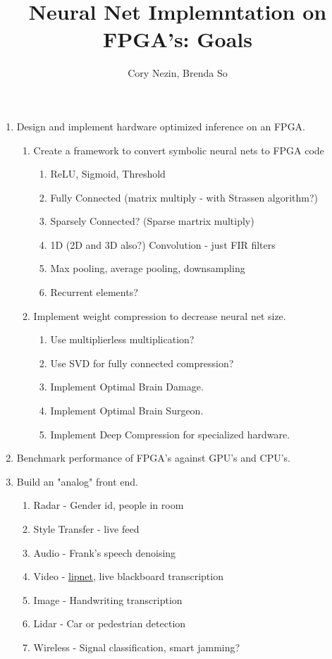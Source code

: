 \documentclass[12pt]{article}
\begin{document}
\title{Neural Net Implemntation on FPGA's: Goals}
\author{Cory Nezin, Brenda So}
\maketitle
\begin{enumerate}
\item Design and implement hardware optimized inference on an FPGA.
  \begin{enumerate}
    \item Create a framework to convert symbolic neural nets to FPGA code
      \begin{enumerate}
        \item ReLU, Sigmoid, Threshold
        \item Fully Connected (matrix multiply - with Strassen algorithm?)
        \item Sparsely Connected? (Sparse martrix multiply)
        \item 1D (2D and 3D also?) Convolution - just FIR filters
        \item Max pooling, average pooling, downsampling
        \item Recurrent elements?
      \end{enumerate}
    \item Implement weight compression to decrease neural net size.
      \begin{enumerate}
        \item Use multiplierless multiplication?
        \item Use SVD for fully connected compression?
        \item Implement Optimal Brain Damage.
        \item Implement Optimal Brain Surgeon.
        \item Implement Deep Compression for specialized hardware.
      \end{enumerate}
  \end{enumerate}
\item Benchmark performance of FPGA's against GPU's and CPU's.

\item Build an "analog" front end.
  \begin{enumerate}
    \item Radar - Gender id, people in room
    \item Style Transfer - live feed
    \item Audio - Frank's speech denoising
    \item Video - \href{https://arxiv.org/pdf/1611.01599.pdf}{lipnet}, live blackboard 
      transcription
    \item Image - Handwriting transcription
    \item Lidar - Car or pedestrian detection
    \item Wireless - Signal classification, smart jamming?
  \end{enumerate}
\end{enumerate}
\end{document}
